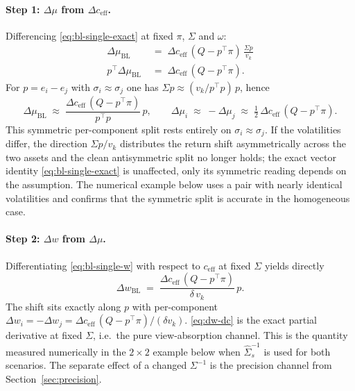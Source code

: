 \documentclass[a4paper,11pt]{article}
\theoremstyle{plain}
\theoremstyle{definition}
\newcommand{\muBL}{\mu_{\mathrm{BL}}}
\newcommand{\eff}{\mathrm{eff}}
\begin{document}
\paragraph{Step 1: $\Delta\mu$ from $\Delta c_{\eff}$.}
Differencing \eqref{eq:bl-single-exact} at fixed $\pi$, $\Sigma$ and
$\omega$:
\begin{align*}
  \Delta\muBL
  \;&=\; \Delta c_{\eff}\,(Q - p^\top\pi)\,\tfrac{\Sigma p}{v_k}\\
  p^\top \Delta\muBL
  \;&=\; \Delta c_{\eff}\,(Q - p^\top\pi).
\end{align*}
For $p = e_i - e_j$ with $\sigma_i \approx \sigma_j$ one has
$\Sigma p \approx (v_k/p^\top p)\,p$, hence
\begin{equation}
\label{eq:dmu-vec}
  \Delta\muBL \;\approx\; \frac{\Delta c_{\eff}\,(Q - p^\top\pi)}{p^\top p}\,p,
  \qquad
  \Delta\mu_i \;\approx\; -\Delta\mu_j \;\approx\; \tfrac{1}{2}\,\Delta c_{\eff}\,(Q - p^\top\pi).
\end{equation}
This symmetric per-component split rests entirely on
$\sigma_i \approx \sigma_j$. If the volatilities differ, the direction
$\Sigma p / v_k$ distributes the return shift asymmetrically across the
two assets and the clean antisymmetric split no longer holds; the exact
vector identity \eqref{eq:bl-single-exact} is unaffected, only its
symmetric reading depends on the assumption. The numerical example below
uses a pair with nearly identical volatilities and confirms that the
symmetric split is accurate in the homogeneous case.

\paragraph{Step 2: $\Delta w$ from $\Delta\mu$.}
Differentiating \eqref{eq:bl-single-w} with respect to $c_{\eff}$ at
fixed $\Sigma$ yields directly
\begin{equation}
\label{eq:dw-dc}
  \Delta w_{\mathrm{BL}} \;=\; \frac{\Delta c_{\eff}\,(Q - p^\top\pi)}{\delta\,v_k}\,p.
\end{equation}
The shift sits exactly along $p$ with per-component
$\Delta w_i = -\Delta w_j = \Delta c_{\eff}\,(Q-p^\top\pi)/(\delta v_k)$.
\eqref{eq:dw-dc} is the exact partial derivative at fixed $\Sigma$,
i.e.\ the pure view-absorption channel. This is the quantity measured
numerically in the $2\times 2$ example below when $\hat\Sigma_s^{-1}$ is
used for both scenarios. The separate effect of a changed $\Sigma^{-1}$
is the precision channel from Section~\ref{sec:precision}.
\end{document}
